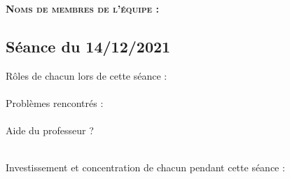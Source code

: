 \documentclass[a4paper,12pt,french]{article}
\begin{document}
\textbf{\textsc{Noms de membres de l'équipe :}}\\




\subsection*{Séance du 14/12/2021}

Rôles de chacun lors de cette séance :\\

\\

Problèmes rencontrés :\\

\\

Aide du professeur ?\\

\\

\newpage

Investissement et concentration de chacun pendant cette séance :\\

\\
\end{document}
